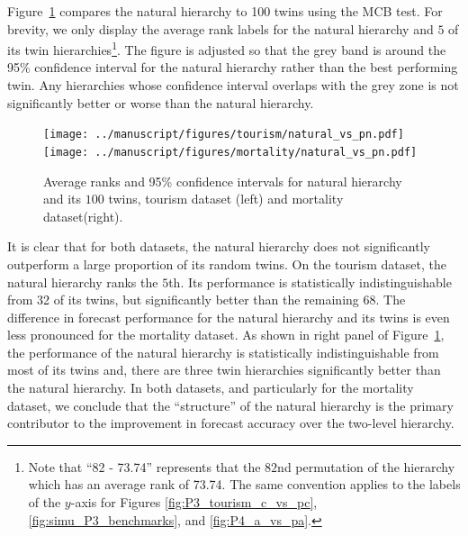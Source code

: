 \documentclass[a4paper,review,12pt,authoryear]{elsarticle}
\begin{document}
\label{subsec:n_vs_pn}


Figure~\ref{fig:P2_tourism} compares the natural hierarchy to 100 twins using the MCB test. For brevity, we only display the average rank labels for the natural hierarchy and $5$ of its twin hierarchies\footnote{Note that ``82 - 73.74'' represents that the $82$nd permutation of the hierarchy which has an average rank of 73.74. The same convention applies to the labels of the $y$-axis for Figures \ref{fig:P3_tourism_c_vs_pc},  \ref{fig:simu_P3_benchmarks}, and \ref{fig:P4_a_vs_pa}.}. The figure is adjusted so that the grey band is around the 95\% confidence interval for the natural hierarchy rather than the best performing twin. Any hierarchies whose confidence interval overlaps with the grey zone is not significantly better or worse than the natural hierarchy. 

\begin{figure}[h!]
    \centering
\texttt{[image: ../manuscript/figures/tourism/natural\_vs\_pn.pdf]}
    \centering    \texttt{[image: ../manuscript/figures/mortality/natural\_vs\_pn.pdf]}
    \caption{\label{fig:P2_tourism}Average ranks and 95\% confidence intervals for natural hierarchy and its $100$ twins, tourism dataset (left) and mortality dataset(right).}
\end{figure}
 

It is clear that for both datasets, the natural hierarchy does not significantly outperform a large proportion of its random twins. 
On the tourism dataset, the natural hierarchy ranks the $5$th. Its performance is statistically indistinguishable from 32 of its twins, but significantly better than the remaining 68. The difference in forecast performance for the natural hierarchy and its twins is even less pronounced for the mortality dataset. As shown in right panel of Figure~\ref{fig:P2_tourism}, the performance of the natural hierarchy is statistically indistinguishable from most of its twins and, there are three twin hierarchies significantly better than the natural hierarchy. %
In both datasets, and particularly for the mortality dataset, we conclude that the ``structure'' of the natural hierarchy is the primary contributor to the improvement in forecast accuracy over the two-level hierarchy.
\end{document}
